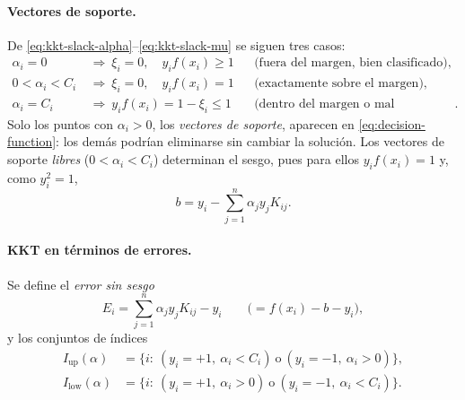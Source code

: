 \documentclass[11pt,a4paper]{article}
\theoremstyle{plain}
\theoremstyle{definition}
\theoremstyle{remark}
\numberwithin{equation}{section}
\begin{document}
\paragraph{Vectores de soporte.} De \eqref{eq:kkt-slack-alpha}--\eqref{eq:kkt-slack-mu} se
siguen tres casos:
\begin{equation}\label{eq:kkt-cases}
  \begin{aligned}
    \alpha_i=0 &\ \Longrightarrow\ \xi_i=0,\quad y_if(x_i)\ge1 &&\text{(fuera del margen, bien clasificado)},\\
    0<\alpha_i<C_i &\ \Longrightarrow\ \xi_i=0,\quad y_if(x_i)=1 &&\text{(exactamente sobre el margen)},\\
    \alpha_i=C_i &\ \Longrightarrow\ y_if(x_i)=1-\xi_i\le1 &&\text{(dentro del margen o mal clasificado)}.
  \end{aligned}
\end{equation}
Solo los puntos con $\alpha_i>0$, los \emph{vectores de soporte}, aparecen en
\eqref{eq:decision-function}: los demás podrían eliminarse sin cambiar la solución. Los
vectores de soporte \emph{libres} ($0<\alpha_i<C_i$) determinan el sesgo, pues para ellos
$y_if(x_i)=1$ y, como $y_i^2=1$,
\begin{equation}\label{eq:bias-free-sv}
  b=y_i-\sum_{j=1}^n\alpha_jy_jK_{ij} .
\end{equation}

\paragraph{KKT en términos de errores.} Se define el \emph{error sin sesgo}
\begin{equation}\label{eq:error-cache}
  E_i=\sum_{j=1}^n\alpha_jy_jK_{ij}-y_i\qquad\bigl(=f(x_i)-b-y_i\bigr),
\end{equation}
y los conjuntos de índices
\begin{equation}\label{eq:index-sets}
  \begin{aligned}
    I_{\mathrm{up}}(\alpha)&=\{i:\ (y_i=+1,\ \alpha_i<C_i)\ \text{o}\ (y_i=-1,\ \alpha_i>0)\},\\
    I_{\mathrm{low}}(\alpha)&=\{i:\ (y_i=+1,\ \alpha_i>0)\ \text{o}\ (y_i=-1,\ \alpha_i<C_i)\}.
  \end{aligned}
\end{equation}
\end{document}
